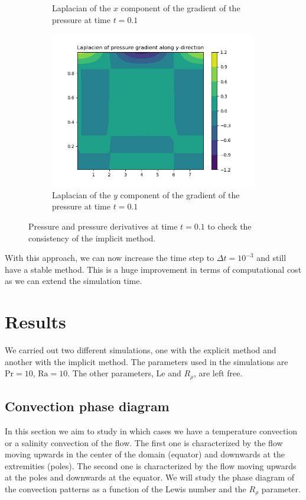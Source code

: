 \documentclass{article}
\def\Ra{\mathrm{Ra}}
\def\Pr{\mathrm{Pr}}
\def\Le{\mathrm{Le}}
\begin{document}
\begin{figure}[ht]
\begin{subfigure}{0.32\textwidth}
    \caption{Laplacian of the $x$ component of the gradient of the pressure at time $t=0.1$}
  \end{subfigure}
  \hfill
  \begin{subfigure}{0.32\textwidth}
    \centering
    \includegraphics[width=\textwidth]{images/pressure_data/laplacian_gradient_y.png}
    \caption{Laplacian of the $y$ component of the gradient of the pressure at time $t=0.1$}
  \end{subfigure}
  \caption{Pressure and pressure derivatives at time $t=0.1$ to check the consistency of the implicit method.}
  \label{fig:pressure}
\end{figure}

With this approach, we can now increase the time step to $\Delta t = 10^{-3}$ and still have a stable method. This is a huge improvement in terms of computational cost as we can extend the simulation time.

\section{Results}
We carried out two different simulations, one with the explicit method and another with the implicit method. The parameters used in the simulations are $\Pr = 10$, $\Ra = 10$. The other parameters, $\Le$ and $R_{\rho}$, are left free.

\subsection{Convection phase diagram}
In this section we aim to study in which cases we have a temperature convection or a salinity convection of the flow. The first one is characterized by the flow moving upwards in the center of the domain (equator) and downwards at the extremities (poles). The second one is characterized by the flow moving upwards at the poles and downwards at the equator. We will study the phase diagram of the convection patterns as a function of the Lewis number and the $R_{\rho}$ parameter.
\end{document}
